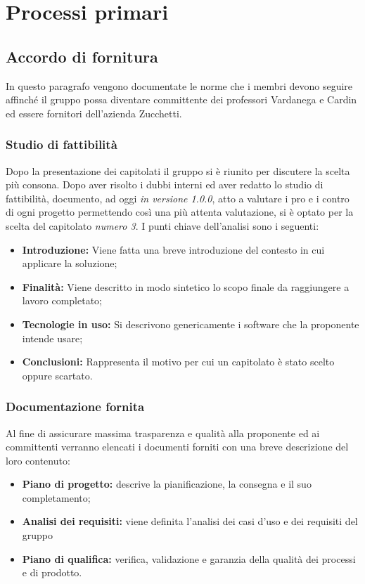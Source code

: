 \section{Processi primari}
    \subsection{Accordo di fornitura}
    	In questo paragrafo vengono documentate le norme che i membri devono seguire affinché il gruppo possa diventare committente dei professori Vardanega e Cardin ed essere fornitori dell'azienda Zucchetti\pedice.
    \subsubsection{Studio di fattibilità}
        Dopo la presentazione dei capitolati il gruppo si è riunito per discutere la scelta più consona. Dopo aver risolto i dubbi interni ed aver redatto lo studio di fattibilità, documento, ad oggi \textit{in versione 1.0.0},  atto a valutare i pro e i contro di ogni progetto permettendo così una più attenta valutazione, si è optato per la scelta del capitolato \textit{numero 3}.  \newline
        I punti chiave dell'analisi sono i seguenti:
    	\begin{itemize}
		   \item \textbf{Introduzione:} Viene fatta una breve introduzione del contesto in cui applicare la soluzione;
		   \item \textbf{Finalità:} Viene descritto in modo sintetico lo scopo finale da raggiungere a lavoro completato;
		   \item \textbf{Tecnologie in uso:} Si descrivono genericamente i software che la proponente intende usare;
		   \item \textbf{Conclusioni:} Rappresenta il motivo per cui un capitolato è stato scelto oppure scartato.
	    \end{itemize}
    \subsubsection{Documentazione fornita}
	    Al fine di assicurare massima trasparenza e qualità alla proponente ed ai committenti verranno elencati i documenti forniti con una breve descrizione del loro contenuto:
    	\begin{itemize}
	        \item \textbf{Piano di progetto:} descrive la pianificazione, la consegna e il suo completamento;
	        \item \textbf{Analisi dei requisiti:} viene definita l'analisi dei casi d'uso e dei requisiti del gruppo
	        \item \textbf{Piano di qualifica:} verifica, validazione e garanzia della qualità dei processi e di prodotto.
	    \end{itemize}
    \newpage    
